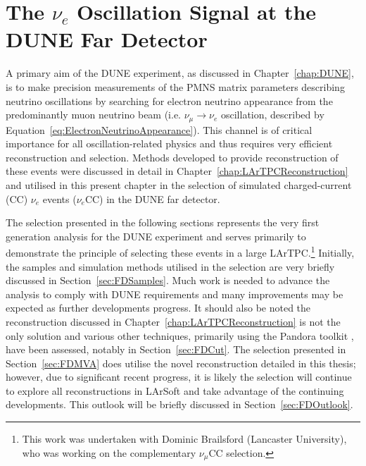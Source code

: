 
\graphicspath{{FarDetectorAnalysis/Figs/}}

\chapter{The $\nu_e$ Oscillation Signal at the DUNE Far Detector}\label{chap:FDAnalysis}

A primary aim of the DUNE experiment, as discussed in Chapter~\ref{chap:DUNE}, is to make precision measurements of the PMNS matrix parameters describing neutrino oscillations by searching for electron neutrino appearance from the predominantly muon neutrino beam (i.e. $\nu_{\mu} \rightarrow \nu_e$ oscillation, described by Equation~\ref{eq:ElectronNeutrinoAppearance}).  This channel is of critical importance for all oscillation-related physics and thus requires very efficient reconstruction and selection.  Methods developed to provide reconstruction of these events were discussed in detail in Chapter~\ref{chap:LArTPCReconstruction} and utilised in this present chapter in the selection of simulated charged-current (CC) $\nu_e$ events ($\nu_e$CC) in the DUNE far detector.

The selection presented in the following sections represents the very first generation analysis for the DUNE experiment and serves primarily to demonstrate the principle of selecting these events in a large LArTPC.\footnote{This work was undertaken with Dominic Brailsford (Lancaster University), who was working on the complementary $\nu_{\mu}$CC selection.}  Initially, the samples and simulation methods utilised in the selection are very briefly discussed in Section~\ref{sec:FDSamples}.  Much work is needed to advance the analysis to comply with DUNE requirements and many improvements may be expected as further developments progress.  It should also be noted the reconstruction discussed in Chapter~\ref{chap:LArTPCReconstruction} is not the only solution and various other techniques, primarily using the Pandora toolkit \cite{Pandora2015}, have been assessed, notably in Section~\ref{sec:FDCut}.  The selection presented in Section~\ref{sec:FDMVA} does utilise the novel reconstruction detailed in this thesis; however, due to significant recent progress, it is likely the selection will continue to explore all reconstructions in LArSoft and take advantage of the continuing developments.  This outlook will be briefly discussed in Section~\ref{sec:FDOutlook}.

